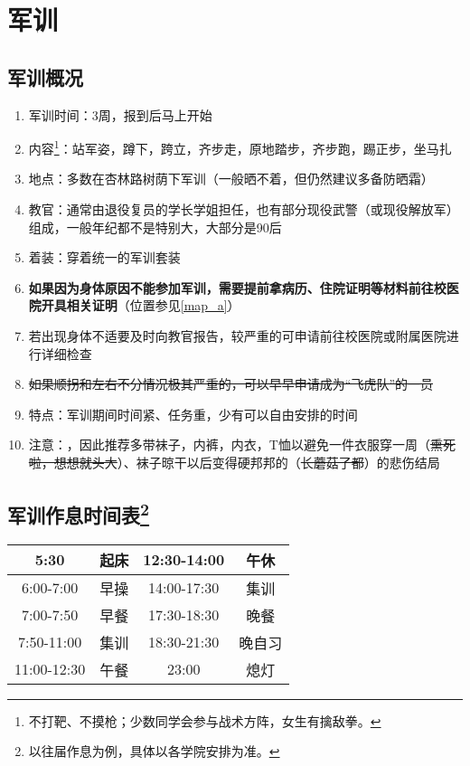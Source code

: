 \chapter[军训]{军训}

\section[军训概况]{军训概况}
\begin{enumerate}
    \item 军训时间：3周，报到后马上开始
    \item 内容\footnote{不打靶、不摸枪；少数同学会参与战术方阵，女生有擒敌拳。}：站军姿，蹲下，跨立，齐步走，原地踏步，齐步跑，踢正步，坐马扎
    \item 地点：多数在杏林路树荫下军训（一般晒不着，但仍然建议多备防晒霜）
    \item 教官：通常由退役复员的学长学姐担任，也有部分现役武警（或现役解放军）组成，一般年纪都不是特别大，大部分是90后
    \item 着装：穿着统一的军训套装\footnotemark
    \item \textbf{如果因为身体原因不能参加军训，需要提前拿病历、住院证明等材料前往校医院开具相关证明\label{exercise_unattend}}（位置参见\uline{\ref{map_a}}）
    \item 若出现身体不适要及时向教官报告，较严重的可申请前往校医院或附属医院进行详细检查
    \item \sout{如果顺拐和左右不分情况极其严重的，可以早早申请成为“飞虎队”\footnotemark 的一员}
    \item 特点：军训期间时间紧、任务重，少有可以自由安排的时间
    \item 注意：\textbf{}，因此推荐多带袜子，内裤，内衣，T恤以避免一件衣服穿一周（\sout{熏死啦，想想就头大}）、袜子晾干以后变得硬邦邦的（\sout{长蘑菇了都}）的悲伤结局
\end{enumerate}

\section[军训作息时间表]{军训作息时间表\footnote{以往届作息为例，具体以各学院安排为准。}}
\begin{table}[H]
    \centering
    \begin{tabular}{|c|c|c|c|}
        \hline
        5:30        & 起床 & 12:30-14:00 & 午休  \\
        \hline
        6:00-7:00   & 早操 & 14:00-17:30 & 集训  \\
        \hline
        7:00-7:50   & 早餐 & 17:30-18:30 & 晚餐  \\
        \hline
        7:50-11:00  & 集训 & 18:30-21:30 & 晚自习 \\
        \hline
        11:00-12:30 & 午餐 & 23:00       & 熄灯  \\
        \hline
    \end{tabular}
\end{table}
